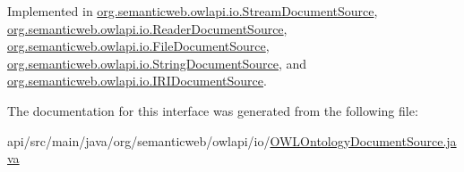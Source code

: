 Implemented in \hyperlink{classorg_1_1semanticweb_1_1owlapi_1_1io_1_1_stream_document_source_ad40633b7f3a6809c8f83ee7bed79d772}{org.\-semanticweb.\-owlapi.\-io.\-Stream\-Document\-Source}, \hyperlink{classorg_1_1semanticweb_1_1owlapi_1_1io_1_1_reader_document_source_a8a55659069af4ef053ff3c3e972b11ab}{org.\-semanticweb.\-owlapi.\-io.\-Reader\-Document\-Source}, \hyperlink{classorg_1_1semanticweb_1_1owlapi_1_1io_1_1_file_document_source_aa0f297473b883051f7cac68d2778b668}{org.\-semanticweb.\-owlapi.\-io.\-File\-Document\-Source}, \hyperlink{classorg_1_1semanticweb_1_1owlapi_1_1io_1_1_string_document_source_af7a782861458a3ff0e7f458af1d49877}{org.\-semanticweb.\-owlapi.\-io.\-String\-Document\-Source}, and \hyperlink{classorg_1_1semanticweb_1_1owlapi_1_1io_1_1_i_r_i_document_source_abf31b14fd21994edf018099ee971575e}{org.\-semanticweb.\-owlapi.\-io.\-I\-R\-I\-Document\-Source}.



The documentation for this interface was generated from the following file\-:\begin{DoxyCompactItemize}
\item 
api/src/main/java/org/semanticweb/owlapi/io/\hyperlink{_o_w_l_ontology_document_source_8java}{O\-W\-L\-Ontology\-Document\-Source.\-java}\end{DoxyCompactItemize}

